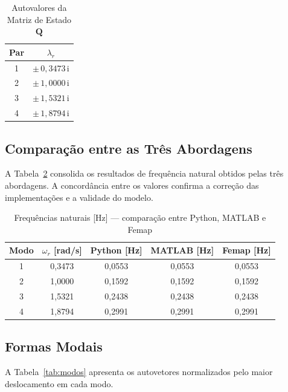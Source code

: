 \documentclass[12pt, a4paper, oneside]{article}
\numberwithin{equation}{section}
\numberwithin{figure}{section}
\numberwithin{table}{section}
\newcommand{\mat}[1]{\mathbf{#1}}
\begin{document}
\begin{table}[htbp]
  \centering
  \caption{Autovalores da Matriz de Estado $\mat{Q}$}
  \label{tab:autovalores}
  \begin{tabular}{cc}
    \toprule
    Par & $\lambda_r$ \\
    \midrule
    1 & $\pm\,0{,}3473\,\mathrm{i}$ \\
    2 & $\pm\,1{,}0000\,\mathrm{i}$ \\
    3 & $\pm\,1{,}5321\,\mathrm{i}$ \\
    4 & $\pm\,1{,}8794\,\mathrm{i}$ \\
    \bottomrule
  \end{tabular}
\end{table}

\subsection{Comparação entre as Três Abordagens}

A Tabela~\ref{tab:comparacao} consolida os resultados de frequência natural
obtidos pelas três abordagens. A concordância entre os valores confirma a
correção das implementações e a validade do modelo.

\begin{table}[htbp]
  \centering
  \caption{Frequências naturais [Hz] --- comparação entre Python, MATLAB e Femap}
  \label{tab:comparacao}
  \begin{tabular}{ccccc}
    \toprule
    Modo & $\omega_r$ [rad/s] & Python [Hz] & MATLAB [Hz] & Femap [Hz] \\
    \midrule
    1 & 0,3473 & 0,0553 & 0,0553 & 0,0553 \\
    2 & 1,0000 & 0,1592 & 0,1592 & 0,1592 \\
    3 & 1,5321 & 0,2438 & 0,2438 & 0,2438 \\
    4 & 1,8794 & 0,2991 & 0,2991 & 0,2991 \\
    \bottomrule
  \end{tabular}
\end{table}

\subsection{Formas Modais}

A Tabela~\ref{tab:modos} apresenta os autovetores normalizados pelo maior
deslocamento em cada modo.
\end{document}
